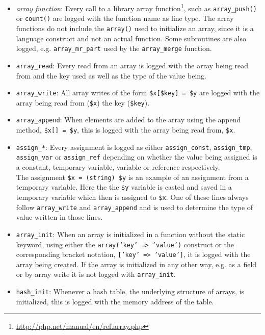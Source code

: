 \begin{itemize}
\item \emph{array function}: Every call to a library array function\footnote{\url{http://php.net/manual/en/ref.array.php}}, such as \texttt{array\_push()} or \texttt{count()} are logged with the function name as line type. The array functions do not include the \texttt{array()} used to initialize an array, since it is a language construct and not an actual function. Some subroutines are also logged, e.g. \texttt{array\_mr\_part} used by the \texttt{array\_merge} function.
\item \texttt{array\_read}: Every read from an array is logged with the array being read from and the key used as well as the type of the value being.
\item \texttt{array\_write}: All array writes of the form \texttt{\$x[\$key] = \$y} are logged with the array being read from (\texttt{\$x}) the key (\texttt{\$key}). 
\item \texttt{array\_append}: When elements are added to the array using the append method, \texttt{\$x[] = \$y}, this is logged with the array being read from, \texttt{\$x}.
\item \texttt{assign\_*}: Every assignment is logged as either \texttt{assign\_const}, \texttt{assign\_tmp}, \texttt{assign\_var} or \texttt{assign\_ref} depending on whether the value being assigned is a constant, temporary variable, variable or reference respectively.\\
The assignment \texttt{\$x = (string) \$y} is an example of an assignment from a temporary variable. Here the the \texttt{\$y} variable is casted and saved in a temporary variable which then is assigned to \texttt{\$x}. One of these lines always follow \texttt{array\_write} and \texttt{array\_append} and is used to determine the type of value written in those lines.
\item \texttt{array\_init}: When an array is initialized in a function without the static keyword, using either the \texttt{array('key' => 'value')} construct or the corresponding bracket notation, \texttt{['key' => 'value']}, it is logged with the array being created. If the array is initialized in any other way, e.g. as a field or by array write it is not logged with \texttt{array\_init}.
\item \texttt{hash\_init}: Whenever a hash table, the underlying structure of arrays, is initialized, this is logged with the memory address of the table.
\end{itemize}


